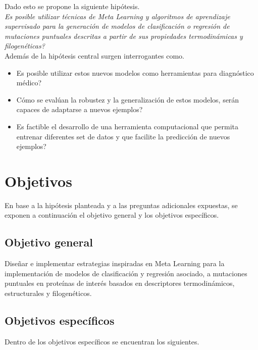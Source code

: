Dado esto se propone la siguiente hipótesis.\\

\textit{Es posible utilizar técnicas de Meta Learning y algoritmos de aprendizaje supervisado para la generación de modelos de clasificación o regresión de mutaciones puntuales descritas a partir de sus propiedades termodinámicas y filogenéticas?}\\

Además de la hipótesis central surgen interrogantes como.

\begin{itemize}
	
	\item Es posible utilizar estos nuevos modelos como herramientas para diagnóstico médico?
	\item Cómo se evalúan la robustez y la generalización de estos modelos, serán capaces de adaptarse a nuevos ejemplos?
	\item Es factible el desarrollo de una herramienta computacional que permita entrenar diferentes set de datos y que facilite la predicción de nuevos ejemplos?
	
\end{itemize}

\section{Objetivos}

En base a la hipótesis planteada y a las preguntas adicionales expuestas, se exponen a continuación el objetivo general y los objetivos específicos.

\subsection{Objetivo general}

Diseñar e implementar estrategias inspiradas en Meta Learning para la implementación de modelos de clasificación y regresión asociado, a mutaciones puntuales en proteínas de interés basados en descriptores termodinámicos, estructurales y filogenéticos.

\subsection{Objetivos específicos}

Dentro de los objetivos específicos se encuentran los siguientes.

